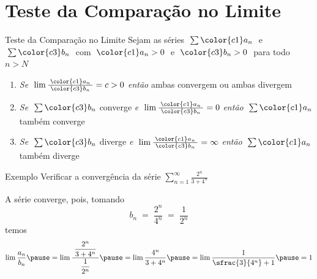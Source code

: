 \documentclass[fleqn,utf8,aspectratio=169,12pt]{beamer}
\begin{document}
\section{Teste da Comparação no Limite}

\begin{frame}{Teste da Comparação no Limite}
  Sejam as séries
  \(\; \sum {\color{c1} a_n} \;\) e
  \(\; \sum {\color{c3} b_n} \;\)
  com $\;{\color{c1} a_n} > 0\;$ e $\;{\color{c3} b_n}>0\;$ para todo $n>N$
  \pause
  \vspace{\baselineskip}
  \begin{enumerate}
    \item
    \emph{Se} \(\;\lim \frac{\;{\color{c1} a_n}\;}{{\color{c3} b_n}} = c > 0 \) \;\;
    \emph{então}\; ambas convergem ou ambas divergem

    \pause
    \vfill
    \item
    \emph{Se} \(\;\sum {\color{c3} b_n}\) converge
    \tabto{36mm} \emph{e} \(\;\lim \frac{\;{\color{c1} a_n}\;}{{\color{c3} b_n}} = 0\)
    \tabto{69mm} \emph{então} \(\;\sum {\color{c1} a_n} \) também converge

    \pause
    \vfill
    \item
    \emph{Se} \(\;\sum {\color{c3} b_n}\) diverge
    \tabto{36mm} \emph{e} \(\;\lim \frac{\;{\color{c1} a_n}\;}{{\color{c3} b_n}} = \infty\)
    \tabto{69mm} \emph{então} \(\;\sum {\color{c1} a_n} \) também diverge

    \vfill
  \end{enumerate}
\end{frame}

\addtocounter{exemplo}{1}
\begin{frame}{Exemplo \theexemplo}
  Verificar a convergência da série
  \(
    \sum_{n=1}^\infty \frac{2^n}{3+4^n}
  \)

  \pause
  \vspace{\baselineskip}
  A série converge\pause, pois, tomando
  \[
    b_n
    \;=\; \frac{2^n}{4^n}
    \;=\; \frac{1}{2^n}
  \]
  \pause
  temos
  \[
    \lim \frac{a_n}{b_n}
    \pause
    = \lim \frac{\;\dfrac{2^n}{3+4^n}\;}{\dfrac{1}{2^n}}
    \pause
    = \lim \frac{4^n}{3+4^n}
    \pause
    = \lim \frac{1}{\sfrac{3}{4^n}+1}
    \pause
    = 1
  \]
\end{frame}
\end{document}

